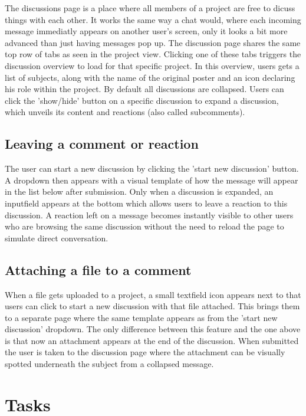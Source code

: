 The discussions page is a place where all members of a project are free to dicuss things with each other. It works the same way a chat would, where
each incoming message immediatly appears on another user's screen, only it looks a bit more advanced than just having messages pop up.
The discussion page shares the same top row of tabs as seen in the project view. Clicking one of these tabs
triggers the discussion overview to load for that specific project. In this overview, users gets a
list of subjects, along with the name of the original poster and an icon declaring his role within the project. 
By default all discussions are collapsed. Users can click the 'show/hide' button on a specific discussion to 
expand a discussion, which unveils its content and reactions (also called subcomments).

\subsection{Leaving a comment or reaction}

The user can start a new discussion by clicking the 'start new discussion' button. A dropdown 
then appears with a visual template of how the message will appear in the list below after submission.  
Only when a discussion is expanded, an inputfield appears at the bottom which allows users to leave a reaction to this discussion. 
A reaction left on a message becomes instantly visible to other users who are browsing the same discussion without the need to reload the page to simulate direct conversation.

\subsection{Attaching a file to a comment}

When a file gets uploaded to a project, a small textfield icon appears next to that users can click to start
a new discussion with that file attached. This brings them to a separate page where the same template appears
as from the 'start new discussion' dropdown. The only difference between this feature and the one above is that now an attachment appears at the end of the discussion. 
When submitted the user is taken to the discussion page where the attachment can be visually spotted underneath the subject from a collapsed message.

\section{Tasks}

